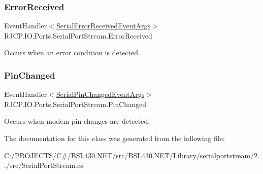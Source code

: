 \subsubsection{\texorpdfstring{ErrorReceived}{ErrorReceived}}
{\footnotesize\ttfamily Event\+Handler$<$\mbox{\hyperlink{class_r_j_c_p_1_1_i_o_1_1_ports_1_1_serial_error_received_event_args}{Serial\+Error\+Received\+Event\+Args}}$>$ R\+J\+C\+P.\+I\+O.\+Ports.\+Serial\+Port\+Stream.\+Error\+Received}



Occurs when an error condition is detected. 

\mbox{\label{class_r_j_c_p_1_1_i_o_1_1_ports_1_1_serial_port_stream_a785d9f0596c4d08e9c71348a1b79688a}} 
\subsubsection{\texorpdfstring{PinChanged}{PinChanged}}
{\footnotesize\ttfamily Event\+Handler$<$\mbox{\hyperlink{class_r_j_c_p_1_1_i_o_1_1_ports_1_1_serial_pin_changed_event_args}{Serial\+Pin\+Changed\+Event\+Args}}$>$ R\+J\+C\+P.\+I\+O.\+Ports.\+Serial\+Port\+Stream.\+Pin\+Changed}



Occurs when modem pin changes are detected. 



The documentation for this class was generated from the following file\+:\begin{DoxyCompactItemize}
\item 
C\+:/\+P\+R\+O\+J\+E\+C\+T\+S/\+C\#/\+B\+S\+L430.\+N\+E\+T/src/\+B\+S\+L430.\+N\+E\+T/\+Library/serialportstream/2../src/Serial\+Port\+Stream.\+cs\end{DoxyCompactItemize}
